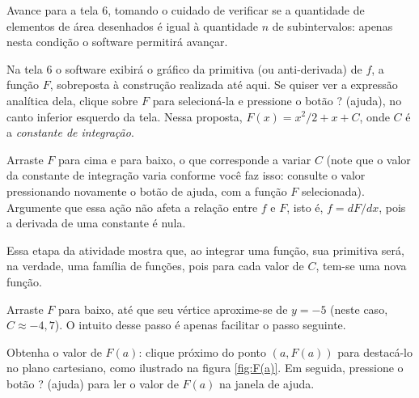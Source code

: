 \documentclass[a4paper,12pt]{scrartcl}
\begin{document}
\begin{list}{.}
      Avance para a tela 6, tomando o cuidado de verificar se a quantidade de elementos de área desenhados é igual à quantidade $n$ de subintervalos: apenas nesta condição o software permitirá avançar.
      
      \item Na tela 6 o software exibirá o gráfico da primitiva (ou anti-derivada) de $f$, a função $F$, sobreposta à construção realizada até aqui. Se quiser ver a expressão analítica dela, clique sobre $F$ para selecioná-la e pressione o botão ? (ajuda), no canto inferior esquerdo da tela. Nessa proposta, $F(x) = x^2/2 + x + C$, onde $C$ é a \emph{constante de integração}.
      
      \item Arraste $F$ para cima e para baixo, o que corresponde a variar $C$ (note que o valor da constante de integração varia conforme você faz isso: consulte o valor pressionando novamente o botão de ajuda, com a função $F$ selecionada). Argumente que essa ação não afeta a relação entre $f$ e $F$, isto é, $f = dF/dx$, pois a derivada de uma constante é nula.
      
      Essa etapa da atividade mostra que, ao integrar uma função, sua primitiva será, na verdade, uma família de funções, pois para cada valor de $C$, tem-se uma nova função.
      
      \item \label{step:C} Arraste $F$ para baixo, até que seu vértice aproxime-se de $y = -5$ (neste caso, $C \approx -4,7$). O intuito desse passo é apenas facilitar o passo seguinte.
      
      \item Obtenha o valor de $F(a)$: clique próximo do ponto $\left(a,F(a)\right)$ para destacá-lo no plano cartesiano, como ilustrado na figura \ref{fig:F(a)}. Em seguida, pressione o botão ? (ajuda) para ler o valor de $F(a)$ na janela de ajuda.
      

\end{list}
\end{document}
